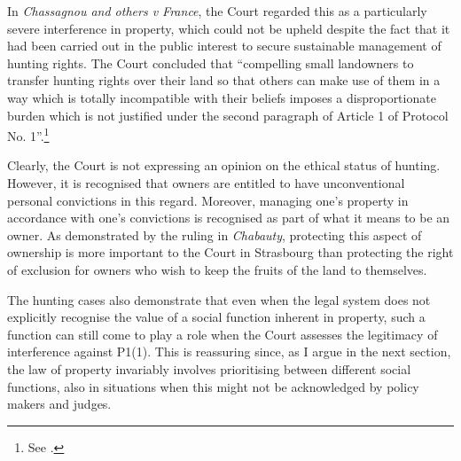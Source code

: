 In {\it Chassagnou and others v France}, the Court regarded this as a particularly severe interference in property, which could not be upheld despite the fact that it had been carried out in the public interest to secure sustainable management of hunting rights. The Court concluded that ``compelling small landowners to transfer hunting rights over their land so that others can make use of them in a way which is totally incompatible with their beliefs imposes a disproportionate burden which is not justified under the second paragraph of Article 1 of Protocol No. 1''.\footnote{See \cite[85]{chassagnou99}.}

Clearly, the Court is not expressing an opinion on the ethical status of hunting. However, it is recognised that owners are entitled to have unconventional personal convictions in this regard. Moreover, managing one's property in accordance with one's convictions is recognised as part of what it means to be an owner. As demonstrated by the ruling in {\it Chabauty}, protecting this aspect of ownership is more important to the Court in Strasbourg than protecting the right of exclusion for owners who wish to keep the fruits of the land to themselves. %


The hunting cases also demonstrate that even when the legal system does not explicitly recognise the value of a social function inherent in property, such a function can still come to play a role when the Court assesses the legitimacy of interference against P1(1). This is reassuring since, as I argue in the next section, the law of property invariably involves prioritising between different social functions, also in situations when this might not be acknowledged by policy makers and judges.

